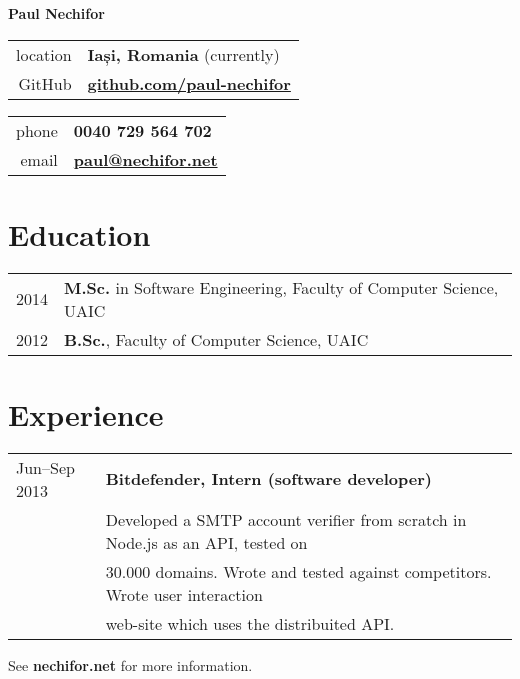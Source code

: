 \documentclass[a4wide]{article}
\begin{document}
\thispagestyle{empty}

\centerline{\LARGE \bf Paul Nechifor}
\vspace{1cm}

\begin{minipage}{0.50\linewidth}
\begin{center}
\begin{tabular}{rl}
  location& {\bf Iași, Romania} (currently)\\
  GitHub& \href{http://github.com/paul-nechifor}{\bf github.com/paul-nechifor}
\end{tabular}
\end{center}
\end{minipage}
\begin{minipage}{0.50\linewidth}
\begin{center}
\begin{tabular}{rl}
  phone& {\bf 0040 729 564 702}\\
  email& \href{mailto:paul@nechifor.net}{\bf paul@nechifor.net}\\
\end{tabular}
\end{center}
\end{minipage}

\section*{Education}

\begin{tabular}{ll}
	2014 & {\bf M.Sc.} in Software Engineering, Faculty of Computer Science, UAIC\\
	2012 & {\bf B.Sc.}, Faculty of Computer Science, UAIC\\
\end{tabular}

\section*{Experience}

\begin{tabular}{ll}
	Jun--Sep 2013&	{\bf Bitdefender, Intern (software developer)}\\
	  & Developed a SMTP account verifier from scratch in Node.js as an API, tested on\\
	  & 30.000 domains. Wrote and tested against competitors. Wrote user interaction\\
    & web-site which uses the distribuited API.\\
\end{tabular}

\vspace{2cm}
\centerline{See \textbf{nechifor.net} for more information.}
\end{document}
